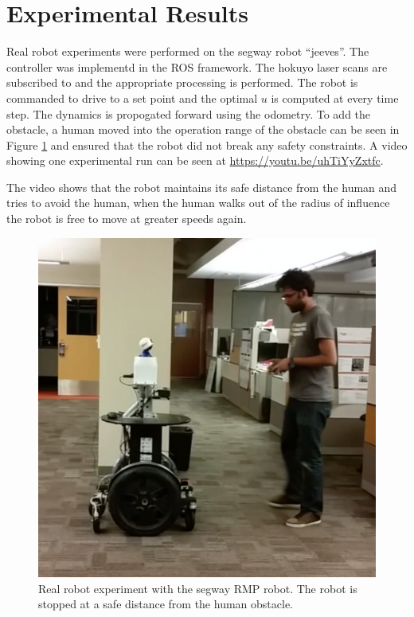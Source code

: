 \documentclass[conference]{IEEEtran}
\begin{document}
\section{Experimental Results}

Real robot experiments were performed on the segway robot ``jeeves''. The controller was implementd in the ROS framework. The hokuyo laser scans are subscribed to and the appropriate processing is performed. The robot is commanded to drive to a set point and the optimal $u$ is computed at every time step. The dynamics is propogated forward using the odometry. To add the obstacle, a human moved into the operation range of the obstacle  can be seen in Figure \ref{fig:jeeves_exp} \fi and ensured that the robot did not break any safety constraints. A video showing one experimental run can be seen at \url {https://youtu.be/uhTiYyZxtfc}.

The video shows that the robot maintains its safe distance from the human and tries to avoid the human, when the human walks out of the radius of influence the robot is free to move at greater speeds again.
 \begin{figure}[h!]
\centering
\includegraphics[scale=0.13]{jeeves_exp.png} 
\caption{Real robot experiment with the segway RMP robot. The robot is stopped at a safe distance from the human obstacle. \label{fig:jeeves_exp}}
\end{figure} \fi
\end{document}
